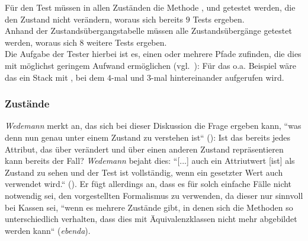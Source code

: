 \noindent
Für den Test müssen in allen Zuständen die Methode ,  und  getestet werden, die den Zustand nicht verändern, woraus sich bereits $9$ Tests ergeben.\\
Anhand der Zustandsübergangstabelle müssen alle Zustandsübergänge getestet werden, woraus sich $8$ weitere Tests ergeben.\\
Die Aufgabe der Tester hierbei ist es, einen oder mehrere Pfade zufinden, die dies mit möglichst geringem Aufwand ermöglichen (vgl.~\cite[48]{Wed09c}): Für das o.a. Beispiel wäre das ein Stack mit , bei dem $4$-mal  und $3$-mal  hintereinander aufgerufen wird.

\subsubsection*{Zustände}
\textit{Wedemann} merkt an, das sich bei dieser Diskussion die Frage ergeben kann, ``was denn nun genau unter einem Zustand zu verstehen ist`` (\cite[48]{Wed09c}): Ist das bereits jedes Attribut, das über  verändert und über  einen anderen Zustand repräsentieren kann bereits der Fall? \textit{Wedemann} bejaht dies: ``[...] auch ein Attriutwert [ist] als Zustand zu sehen und der Test ist vollständig, wenn ein gesetzter Wert auch verwendet wird.`` (\cite[48]{Wed09c}).
Er fügt allerdings an, dass es für solch einfache Fälle nicht notwendig sei, den vorgestellten Formalismus zu verwenden, da dieser nur sinnvoll bei Kassen sei, ``wenn es mehrere Zustände gibt, in denen sich die Methoden so unterschiedlich verhalten, dass dies mit Äquivalenzklassen nicht mehr abgebildet werden kann`` (\textit{ebenda}).